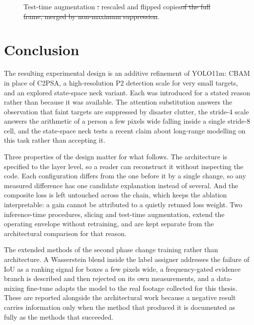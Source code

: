 \documentclass[12pt,a4paper,oneside]{report}
\providecommand{\DIFadd}[1]{{\protect\color{blue}\uwave{#1}}} %
\providecommand{\DIFdel}[1]{{\protect\color{red}\sout{#1}}}                      %
\providecommand{\DIFaddFL}[1]{\DIFadd{#1}} %
\providecommand{\DIFdelFL}[1]{\DIFdel{#1}} %
\providecommand{\DIFaddbeginFL}{} %
\providecommand{\DIFaddendFL}{} %
\providecommand{\DIFdelbeginFL}{} %
\providecommand{\DIFdelendFL}{} %
\begin{document}
\begin{figure}[tbp]
  \centering
  \DIFdelbeginFL %
\DIFdelendFL \DIFaddbeginFL \caption{\DIFaddendFL Test-time augmentation \DIFdelbeginFL \DIFdelFL{: }\DIFdelendFL \DIFaddbeginFL \DIFaddFL{on }\DIFaddendFL rescaled and flipped copies\DIFdelbeginFL \DIFdelFL{of the full frame, merged by non-maximum suppression}\DIFdelendFL .}
  \label{fig:ttapipe}
\end{figure}

\section{Conclusion}
The resulting experimental design is an additive refinement of YOLO11m: CBAM
in place of C2PSA, a high-resolution P2 detection scale for very small targets,
and an explored state-space neck variant. Each was introduced for a stated
reason rather than because it was available. The attention substitution answers
the observation that faint targets are suppressed by disaster clutter, the
stride-4 scale answers the arithmetic of a person a few pixels wide falling
inside a single stride-8 cell, and the state-space neck tests a recent claim
about long-range modelling on this task rather than accepting it.

Three properties of the design matter for what follows. The architecture is
specified to the layer level, so a reader can reconstruct it without inspecting
the code. Each configuration differs from the one before it by a single change,
so any measured difference has one candidate explanation instead of several.
And the composite loss is left untouched across the chain, which keeps the
ablation interpretable: a gain cannot be attributed to a quietly retuned loss
weight. Two inference-time procedures, slicing and test-time augmentation,
extend the operating envelope without retraining, and are kept separate from
the architectural comparison for that reason.

The extended methods of the second phase change training rather than
architecture. A Wasserstein blend inside the label assigner addresses the
failure of IoU as a ranking signal for boxes a few pixels wide, a
frequency-gated evidence branch is described and then rejected on its own
measurements, and a data-mixing fine-tune adapts the model to the real footage
collected for this thesis. These are reported alongside the architectural work
because a negative result carries information only when the method that
produced it is documented as fully as the methods that succeeded.
\end{document}
